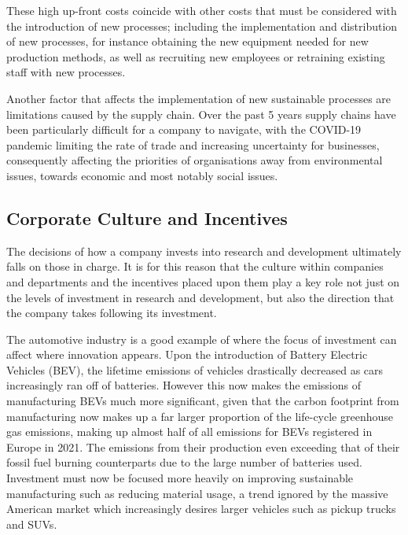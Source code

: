 \documentclass[11pt,a4paper]{article}
\begin{document}
These high up-front costs coincide with other costs that must be considered with the introduction of new processes; including the implementation and distribution of new processes, for instance obtaining the new equipment needed for new production methods, as well as recruiting new employees or retraining existing staff with new processes.

Another factor that affects the implementation of new sustainable processes are limitations caused by the supply chain. Over the past 5 years supply chains have been particularly difficult for a company to navigate, with the COVID-19 pandemic limiting the rate of trade and increasing uncertainty for businesses, consequently affecting the priorities of organisations away from environmental issues, towards economic and most notably social issues\cite{barreiro2020changes}.


\subsection*{Corporate Culture and Incentives}

The decisions of how a company invests into research and development ultimately falls on those in charge. It is for this reason that the culture within companies and departments and the incentives placed upon them play a key role not just on the levels of investment in research and development, but also the direction that the company takes following its investment.

The automotive industry is a good example of where the focus of investment can affect where innovation appears. Upon the introduction of Battery Electric Vehicles (BEV), the lifetime emissions of vehicles drastically decreased as cars increasingly ran off of batteries\cite{bieker2021global}. However this now makes the emissions of manufacturing BEVs much more significant, given that the carbon footprint from manufacturing now makes up a far larger proportion of the life-cycle greenhouse gas emissions, making up almost half of all emissions for BEVs registered in Europe in 2021. The emissions from their production even exceeding that of their fossil fuel burning counterparts\cite{bieker2021global} due to the large number of batteries used. Investment must now be focused more heavily on improving sustainable manufacturing such as reducing material usage, a trend ignored by the massive American market which increasingly desires larger vehicles such as pickup trucks and SUVs\cite{moawad2016assessment}.\\
\end{document}

